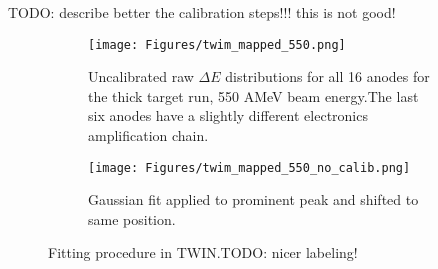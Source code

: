 TODO: describe better the calibration steps!!! this is not good!
\begin{figure}
     \centering
     \begin{subfigure}[t]{0.45\textwidth}
         \centering
         \texttt{[image: Figures/twim\_mapped\_550.png]}
         \caption{Uncalibrated raw $\Delta E$ distributions for all 16 anodes for the thick target run, 550 AMeV beam energy.The last six anodes have a slightly different electronics amplification chain.}
         \label{fig:raw_twim}
     \end{subfigure}
     \hfill
     \begin{subfigure}[t]{0.45\textwidth}
         \centering
         \texttt{[image: Figures/twim\_mapped\_550\_no\_calib.png]}
         \caption{Gaussian fit applied to prominent peak and shifted to same position.}
         \label{fig:cal_twim_one}
     \end{subfigure}
     \hfill
        \caption{Fitting procedure in TWIN.TODO: nicer labeling!}
        \label{fig:calibration}
\end{figure}
